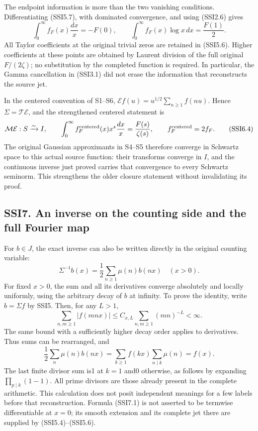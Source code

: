The endpoint information is more than the two vanishing conditions.
Differentiating (SSI5.7), with dominated convergence, and using (SSI2.6)
gives \[
\int_0^\infty f_F(x)\frac{dx}{x}=-F(0),\qquad
\int_0^\infty f_F(x)\log x\,dx=\frac{F(1)}2.
\tag{SSI6.3}
\] All Taylor coefficients at the original trivial zeros are retained in
(SSI5.6). Higher coefficients at these points are obtained by Laurent
division of the full original \(F/(2\zeta)\); no substitution by the
completed function is required. In particular, the Gamma cancellation in
(SSI3.1) did not erase the information that reconstructs the source jet.

In the centered convention of S1--S6,
\(\mathcal E f(u)=u^{1/2}\sum_{n\ge1}f(nu)\). Hence
\(\Sigma=\mathcal T\mathcal E\), and the strengthened centered statement
is \[
\mathcal M\mathcal E:S\xrightarrow{\sim}I,\qquad
\int_0^\infty f_F^{\rm centered}(x)x^s\frac{dx}{x}
=\frac{F(s)}{\zeta(s)},\qquad
f_F^{\rm centered}=2f_F.
\tag{SSI6.4}
\] The original Gaussian approximants in S4--S5 therefore converge in
Schwartz space to this actual source function: their transforms converge
in \(I\), and the continuous inverse just proved carries that
convergence to every Schwartz seminorm. This strengthens the older
closure statement without invalidating its proof.

\subsection{SSI7. An inverse on the counting side and the full Fourier
map}\label{ssi7.-an-inverse-on-the-counting-side-and-the-full-fourier-map}

For \(b\in J\), the exact inverse can also be written directly in the
original counting variable: \[
\boxed{\Sigma^{-1}b(x)=\frac12\sum_{n\ge1}\mu(n)b(nx)}
\quad(x>0).
\tag{SSI7.1}
\] For fixed \(x>0\), the sum and all its derivatives converge
absolutely and locally uniformly, using the arbitrary decay of \(b\) at
infinity. To prove the identity, write \(b=\Sigma f\) by SSI5. Then, for
any \(L>1\), \[
\sum_{n,m\ge1}|f(mnx)|
\le C_{x,L}\sum_{n,m\ge1}(mn)^{-L}<\infty.
\tag{SSI7.2}
\] The same bound with a sufficiently higher decay order applies to
derivatives. Thus sums can be rearranged, and \[
\frac12\sum_n\mu(n)b(nx)
=\sum_{k\ge1}f(kx)\sum_{n\mid k}\mu(n)=f(x).
\tag{SSI7.3}
\] The last finite divisor sum is1 at \(k=1\) and0 otherwise, as follows
by expanding \(\prod_{p\mid k}(1-1)\). All prime divisors are those
already present in the complete arithmetic. This calculation does not
posit independent meanings for a few labels before that reconstruction.
Formula (SSI7.1) is not asserted to be termwise differentiable at
\(x=0\); its smooth extension and its complete jet there are supplied by
(SSI5.4)--(SSI5.6).

